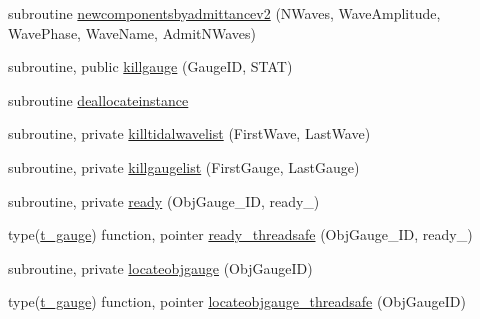 \begin{DoxyCompactItemize}
\item 
subroutine \mbox{\hyperlink{namespacemodulegauge_ac754b86d90578ff131adeb4a3ac03dc5}{newcomponentsbyadmittancev2}} (N\+Waves, Wave\+Amplitude, Wave\+Phase, Wave\+Name, Admit\+N\+Waves)
\item 
subroutine, public \mbox{\hyperlink{namespacemodulegauge_a545694594f895a232c1f0b4fc8256bb9}{killgauge}} (Gauge\+ID, S\+T\+AT)
\item 
subroutine \mbox{\hyperlink{namespacemodulegauge_a9e3c4492d77966e5e963fad0f376379f}{deallocateinstance}}
\item 
subroutine, private \mbox{\hyperlink{namespacemodulegauge_acb5358a89d47698a9abd5cea060b0cc8}{killtidalwavelist}} (First\+Wave, Last\+Wave)
\item 
subroutine, private \mbox{\hyperlink{namespacemodulegauge_a773a918cd865d16ad9720682f4f76009}{killgaugelist}} (First\+Gauge, Last\+Gauge)
\item 
subroutine, private \mbox{\hyperlink{namespacemodulegauge_a8ece20a220d6beae6919846687d6fe8f}{ready}} (Obj\+Gauge\+\_\+\+ID, ready\+\_\+)
\item 
type(\mbox{\hyperlink{structmodulegauge_1_1t__gauge}{t\+\_\+gauge}}) function, pointer \mbox{\hyperlink{namespacemodulegauge_a758cb1de5348d750b81f0adbb711363f}{ready\+\_\+threadsafe}} (Obj\+Gauge\+\_\+\+ID, ready\+\_\+)
\item 
subroutine, private \mbox{\hyperlink{namespacemodulegauge_ad450a5738058992462096cd7d19b5a94}{locateobjgauge}} (Obj\+Gauge\+ID)
\item 
type(\mbox{\hyperlink{structmodulegauge_1_1t__gauge}{t\+\_\+gauge}}) function, pointer \mbox{\hyperlink{namespacemodulegauge_a40155a54ed9673433a35e0eb72673928}{locateobjgauge\+\_\+threadsafe}} (Obj\+Gauge\+ID)
\end{DoxyCompactItemize}

